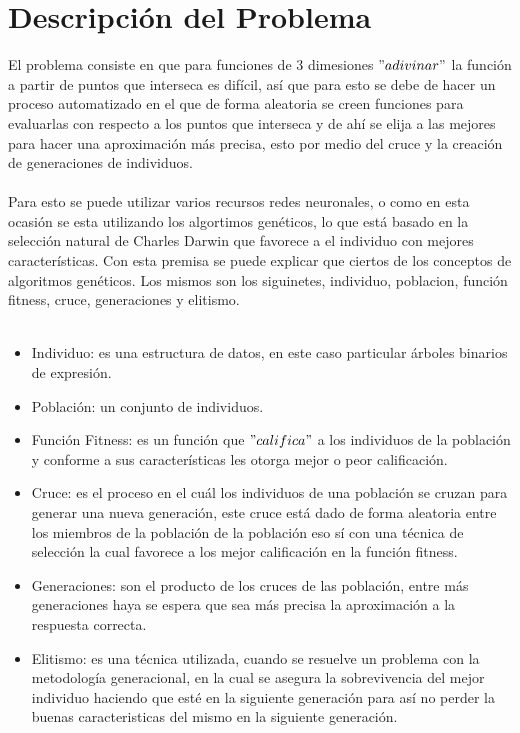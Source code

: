 \documentclass[10pt,a4paper]{article}
\begin{document}
\section{Descripción del Problema}
 El problema consiste en que para funciones de 3 dimesiones  $"adivinar"$ la función a partir de puntos que interseca es
difícil, así que para esto se debe de hacer un proceso automatizado en el que de forma aleatoria se creen funciones para evaluarlas con respecto a los puntos que interseca y de ahí se elija a las mejores para hacer una aproximación más precisa, esto por medio del cruce y la creación de generaciones de individuos.\\\\
Para esto se puede utilizar varios recursos redes neuronales, o como en esta ocasión se esta utilizando los algortimos genéticos, lo que está basado en la selección natural de Charles Darwin que favorece a el individuo con mejores características. Con esta premisa se puede explicar que ciertos de los conceptos de algoritmos genéticos. Los mismos son los siguinetes, individuo, poblacion, función fitness, cruce, generaciones y elitismo. \\\\
\begin{itemize}
\item Individuo: es una estructura de datos, en este caso particular árboles binarios de expresión. \\
\item Población: un conjunto de individuos.\\
\item Función Fitness: es un función que $"califica"$ a los individuos de la población y conforme a sus características les otorga mejor o peor calificación. \\
\item Cruce: es el proceso en el cuál los individuos de una población se cruzan para generar una nueva generación, este cruce está dado de forma aleatoria entre los miembros de la población de la población eso sí con una técnica de selección la cual favorece a los mejor calificación en la función fitness.\\
\item Generaciones: son el producto de los cruces de las población, entre más generaciones haya se espera que sea más precisa la aproximación a la respuesta correcta.\\
\item Elitismo: es una técnica utilizada, cuando se resuelve un problema con la metodología generacional, en la cual se asegura la sobrevivencia del mejor individuo haciendo que esté en la siguiente generación para así no perder la buenas caracteristicas del mismo en la siguiente generación. \\
\end{itemize}
\end{document}
